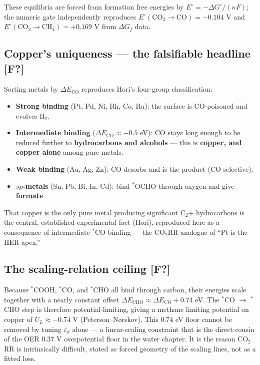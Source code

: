\documentclass[
  10pt,
]{article}
\providecommand{\tightlist}{%
  \setlength{\itemsep}{0pt}\setlength{\parskip}{0pt}}
\begin{document}
These equilibria are forced from formation free energies by
\(E^\circ = -\Delta G^\circ/(nF)\); the numeric gate independently
reproduces \(E^\circ(\mathrm{CO}_2\!\to\!\mathrm{CO}) = -0.104\) V and
\(E^\circ(\mathrm{CO}_2\!\to\!\mathrm{CH}_4) = +0.169\) V from
\(\Delta G_f\) data.

\hypertarget{coppers-uniqueness-the-falsifiable-headline-f}{%
\subsection{\texorpdfstring{Copper's uniqueness --- the falsifiable
headline
\textbf{{[}F?{]}}}{Copper's uniqueness --- the falsifiable headline {[}F?{]}}}\label{coppers-uniqueness-the-falsifiable-headline-f}}

Sorting metals by \(\Delta E_{\mathrm{CO}}\) reproduces Hori's
four-group classification:

\begin{itemize}
\tightlist
\item
  \textbf{Strong binding} (Pt, Pd, Ni, Rh, Co, Ru): the surface is
  CO-poisoned and evolves H\(_2\).
\item
  \textbf{Intermediate binding} (\(\Delta E_{\mathrm{CO}} \approx -0.5\)
  eV): CO stays long enough to be reduced further to
  \textbf{hydrocarbons and alcohols} --- this is \textbf{copper, and
  copper alone} among pure metals.
\item
  \textbf{Weak binding} (Au, Ag, Zn): CO desorbs and is the product
  (CO-selective).
\item
  \textbf{\(sp\)-metals} (Sn, Pb, Bi, In, Cd): bind \(^*\)OCHO through
  oxygen and give \textbf{formate}.
\end{itemize}

That copper is the only pure metal producing significant C\(_2\)+
hydrocarbons is the central, established experimental fact (Hori),
reproduced here as a consequence of intermediate \(^*\)CO binding ---
the CO\(_2\)RR analogue of ``Pt is the HER apex.''

\hypertarget{the-scaling-relation-ceiling-f}{%
\subsection{\texorpdfstring{The scaling-relation ceiling
\textbf{{[}F?{]}}}{The scaling-relation ceiling {[}F?{]}}}\label{the-scaling-relation-ceiling-f}}

Because \(^*\)COOH, \(^*\)CO, and \(^*\)CHO all bind through carbon,
their energies scale together with a nearly constant offset
\(\Delta E_{\mathrm{CHO}} \approx \Delta E_{\mathrm{CO}} + 0.74\) eV.
The \(^*\)CO \(\to\) \(^*\)CHO step is therefore potential-limiting,
giving a methane limiting potential on copper of \(U_L \approx -0.74\) V
(Peterson--Nørskov). This \(0.74\) eV floor cannot be removed by tuning
\(\varepsilon_d\) alone --- a linear-scaling constraint that is the
direct cousin of the OER \(0.37\) V overpotential floor in the water
chapter. It is the reason CO\(_2\)RR is intrinsically difficult, stated
as forced geometry of the scaling lines, not as a fitted loss.
\end{document}
